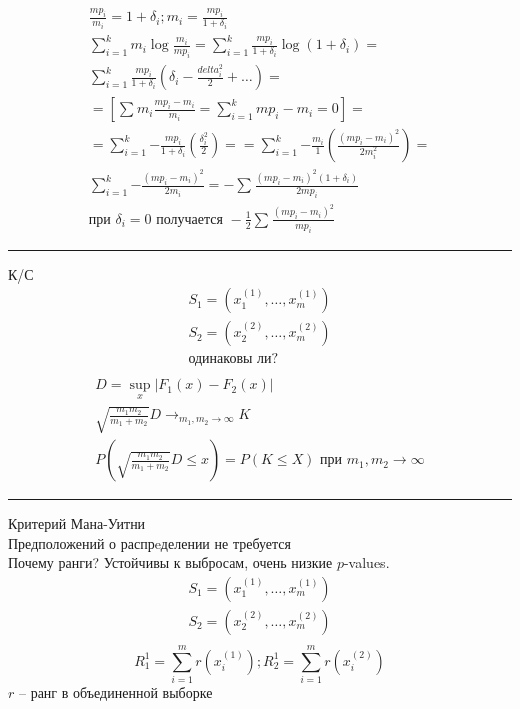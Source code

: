 \documentclass{book}
\begin{document}
\begin{gather*}
  \frac{mp_i}{m_i}=1+\delta_i; m_i=\frac{mp_i}{1+\delta_i}\\
  \sum_{i=1}^{k} {m_i\log\frac{m_i}{mp_i}} = \sum_{i=1}^{k} {\frac{mp_i}{1+\delta_i}\log(1+\delta_i)}=\\
  \sum_{i=1}^{k} {\frac{mp_i}{1+\delta_i}(\delta_i-\frac{delta_i^2}{2}+\dots)}=\\
  =\left[\sum_{}^{} {m_i\frac{mp_i-m_i}{m_i}=\sum_{i=1}^{k} {mp_i-m_i}}=0\right]=\\
  =\sum_{i=1}^{k} {-\frac{mp_i}{1+\delta_i}\left(\frac{\delta_i^2}{2}\right)}=
  =\sum_{i=1}^{k} {-\frac{m_i}{1}\left(\frac{\left(mp_i-m_i\right)^2}{2m_i^2}\right)}=\\
  \sum_{i=1}^{k} {-\frac{(mp_i-m_i)^2}{2m_i}}=-\sum_{}^{} {\frac{(mp_i-m_i)^2(1+\delta_i)}{2mp_i}}\\
  \textrm{при }\delta_i=0\textrm{ получается } -\frac{1}{2}\sum_{}^{} {\frac{(mp_i-m_i)^2}{mp_i}}
\end{gather*}
\hrule
К/С
\begin{gather*}
  S_1=(x_1^{(1)}, \dots, x_m^{(1)})\\
  S_2=(x_2^{(2)}, \dots, x_m^{(2)})\\
  \textrm{одинаковы ли?}\\
\end{gather*}
\begin{gather*}
  D=\sup_x |F_1(x)-F_2(x)|\\
  \sqrt{\frac{m_1m_2}{m_1+m_2}}D\rightarrow_{m_1,m_2\rightarrow\infty}K\\
  P \left(\sqrt{\frac{m_1m_2}{m_1+m_2}}D\leq x\right) = P(K\leq X) \textrm{ при }m_1, m_2\rightarrow \infty
\end{gather*}
\hrule
Критерий Мана-Уитни\\
Предположений о распрeделении не требуется\\
Почему ранги? Устойчивы к выбросам, очень низкие $p$-values.\\

\begin{gather*}
  S_1=(x_1^{(1)}, \dots, x_m^{(1)})\\
  S_2=(x_2^{(2)}, \dots, x_m^{(2)})\\
\end{gather*}
\[
  R_1^{1}=\sum_{i=1}^{m} {r(x_i^{(1)})};
  R_2^{1}=\sum_{i=1}^{m} {r(x_i^{(2)})}
\]
$r$ -- ранг в объединенной выборке\\
\end{document}
